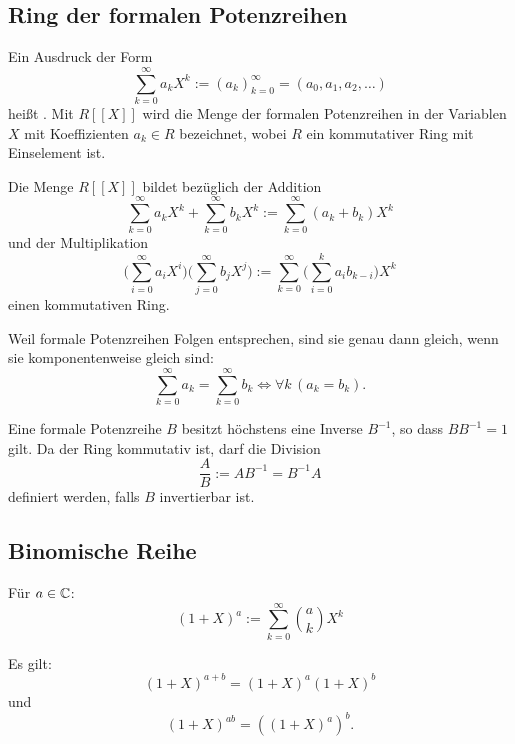 \subsection{Ring der formalen Potenzreihen}
\begin{definition}
Ein Ausdruck der Form
\begin{equation}
\sum_{k=0}^\infty a_k X^k := (a_k)_{k=0}^\infty = (a_0,a_1,a_2,\ldots)
\end{equation}
heißt . Mit $R[[X]]$ wird die Menge
der formalen Potenzreihen in der Variablen $X$ mit Koeffizienten
$a_k\in R$ bezeichnet, wobei $R$ ein kommutativer Ring
mit Einselement ist.
\end{definition}
Die Menge $R[[X]]$ bildet bezüglich der Addition
\begin{equation}
\sum_{k=0}^\infty a_k X^k+\sum_{k=0}^\infty b_k X^k
:= \sum_{k=0}^\infty (a_k+b_k)X^k
\end{equation}
und der Multiplikation
\begin{equation}
\bigg(\sum_{i=0}^\infty a_i X^i\bigg)\bigg(\sum_{j=0}^\infty b_j X^j\bigg)
:= \sum_{k=0}^\infty \bigg(\sum_{i=0}^{k} a_ib_{k-i}\bigg)X^k
\end{equation}
einen kommutativen Ring.

 Weil formale Potenzreihen
Folgen entsprechen, sind sie genau dann gleich, wenn sie
komponentenweise gleich sind:
\begin{equation}
\sum_{k=0}^\infty a_k = \sum_{k=0}^\infty b_k
\iff \forall k\,(a_k=b_k).
\end{equation}

Eine formale Potenzreihe $B$ besitzt höchstens eine Inverse $B^{-1}$,
so dass $BB^{-1}=1$ gilt. Da der Ring kommutativ ist, darf die
Division
\begin{equation}
\frac{A}{B} := AB^{-1} = B^{-1}A
\end{equation}
definiert werden, falls $B$ invertierbar ist.

\subsection{Binomische Reihe}
\begin{definition}
Für $a\in\mathbb C$:
\begin{equation}
(1+X)^a := \sum_{k=0}^\infty \binom{a}{k} X^k
\end{equation}
\end{definition}
\noindent
Es gilt:
\begin{equation}
(1+X)^{a+b} = (1+X)^a (1+X)^b 
\end{equation}
und
\begin{equation}
(1+X)^{ab} = ((1+X)^a)^b.
\end{equation}
